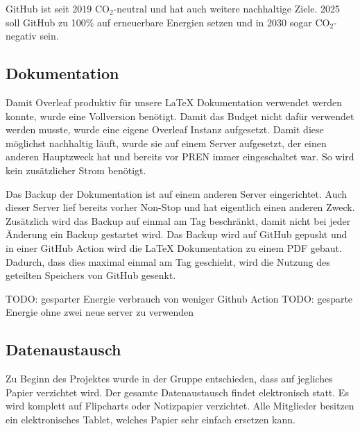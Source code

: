 GitHub ist seit 2019 CO$_{2}$-neutral und hat auch weitere nachhaltige Ziele. 2025 soll GitHub zu 100\% auf erneuerbare Energien setzen und in 2030 sogar CO$_{2}$-negativ sein.\cite{github-goals}







\subsection{Dokumentation}

Damit Overleaf produktiv für unsere LaTeX Dokumentation verwendet werden konnte, wurde eine Vollversion benötigt. Damit das Budget nicht dafür verwendet werden musste, wurde eine eigene Overleaf Instanz aufgesetzt. Damit diese möglichst nachhaltig läuft, wurde sie auf einem Server aufgesetzt, der einen anderen Hauptzweck hat und bereits vor PREN immer eingeschaltet war. So wird kein zusätzlicher Strom benötigt.

Das Backup der Dokumentation ist auf einem anderen Server eingerichtet. Auch dieser Server lief bereits vorher Non-Stop und hat eigentlich einen anderen Zweck. Zusätzlich wird das Backup auf einmal am Tag beschränkt, damit nicht bei jeder Änderung ein Backup gestartet wird. Das Backup wird auf GitHub gepusht und in einer GitHub Action wird die LaTeX Dokumentation zu einem PDF gebaut. Dadurch, dass dies maximal einmal am Tag geschieht, wird die Nutzung des geteilten Speichers von GitHub gesenkt.

TODO: gesparter Energie verbrauch von weniger Github Action
TODO: gesparte Energie ohne zwei neue server zu verwenden

\subsection{Datenaustausch}

Zu Beginn des Projektes wurde in der Gruppe entschieden, dass auf jegliches Papier verzichtet wird. Der gesamte Datenaustausch findet elektronisch statt. Es wird komplett auf Flipcharts oder Notizpapier verzichtet. Alle Mitglieder besitzen ein elektronisches Tablet, welches Papier sehr einfach ersetzen kann.